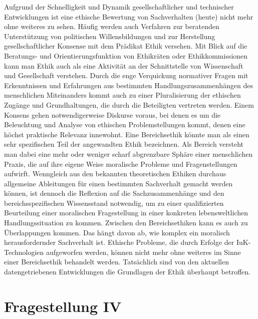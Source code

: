 \documentclass[journal]{IEEEtran}
\begin{document}
\begin{onecolumn}
Aufgrund der Schnelligkeit und Dynamik gesellschaftlicher und technischer Entwicklungen ist eine ethische Bewertung von Sachverhalten (heute) nicht mehr ohne weiteres zu sehen.
Häufig werden auch Verfahren zur beratenden Unterstützung von politischen Willensbildungen und zur Herstellung gesellschaftlicher Konsense mit dem Prädikat Ethik versehen.
Mit Blick auf die Beratungs- und Orientierungsfunktion von Ethikräten oder Ethikkommissionen kann man Ethik auch als eine Aktivität an der Schnittstelle von Wissenschaft und Gesellschaft verstehen.
Durch die enge Verquickung normativer Fragen mit Erkenntnissen und Erfahrungen aus bestimmten Handlungszusammenhängen des menschlichen Miteinanders kommt auch zu einer Pluralisierung der ethischen Zugänge und Grundhaltungen, die durch die Beteiligten vertreten werden.
Einem Konsens gehen notwendigerweise Diskurse voraus, bei denen es um die Beleuchtung und Analyse von ethischen Problemstellungen kommt, denen eine höchst praktische Relevanz innewohnt.
Eine Bereichsethik könnte man als einen sehr spezifischen Teil der angewandten Ethik bezeichnen. Als Bereich versteht man dabei eine mehr oder weniger scharf abgrenzbare Sphäre einer menschlichen Praxis, die auf ihre eigene Weise moralische Probleme und Fragenstellungen aufwirft.
Wenngleich aus den bekannten theoretischen Ethiken durchaus allgemeine Ableitungen für einen bestimmten Sachverhalt gemacht werden können, ist dennoch die Reflexion auf die Sachzusammenhänge und den bereichsspezifischen Wissensstand notwendig, um zu einer qualifizierten Beurteilung einer moralischen Fragestellung in einer konkreten lebensweltlichen Handlungssituation zu kommen.
Zwischen den Bereichsethiken kann es auch zu Überlappungen kommen. Das hängt davon ab, wie komplex ein moralisch herausfordernder Sachverhalt ist.
Ethische Probleme, die durch Erfolge der IuK-Technologien aufgeworfen werden, können nicht mehr ohne weiteres im Sinne einer Bereichsethik behandelt werden. Tatsächlich sind von den aktuellen datengetriebenen Entwicklungen die Grundlagen der Ethik überhaupt betroffen.

\section*{Fragestellung IV}


\end{onecolumn}
\end{document}
